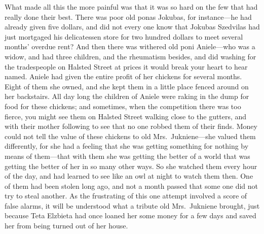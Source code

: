 \documentclass[
]{book}
\theoremstyle{definition}
\theoremstyle{definition}
\theoremstyle{definition}
\theoremstyle{definition}
\theoremstyle{remark}
\begin{document}
What made all this the more painful was that it was so hard on the few that had really done their best. There was poor old ponas Jokubas, for instance---he had already given five dollars, and did not every one know that Jokubas Szedvilas had just mortgaged his delicatessen store for two hundred dollars to meet several months' overdue rent? And then there was withered old poni Aniele---who was a widow, and had three children, and the rheumatism besides, and did washing for the tradespeople on Halsted Street at prices it would break your heart to hear named. Aniele had given the entire profit of her chickens for several months. Eight of them she owned, and she kept them in a little place fenced around on her backstairs. All day long the children of Aniele were raking in the dump for food for these chickens; and sometimes, when the competition there was too fierce, you might see them on Halsted Street walking close to the gutters, and with their mother following to see that no one robbed them of their finds. Money could not tell the value of these chickens to old Mrs.~Jukniene---she valued them differently, for she had a feeling that she was getting something for nothing by means of them---that with them she was getting the better of a world that was getting the better of her in so many other ways. So she watched them every hour of the day, and had learned to see like an owl at night to watch them then. One of them had been stolen long ago, and not a month passed that some one did not try to steal another. As the frustrating of this one attempt involved a score of false alarms, it will be understood what a tribute old Mrs.~Jukniene brought, just because Teta Elzbieta had once loaned her some money for a few days and saved her from being turned out of her house.
\end{document}
